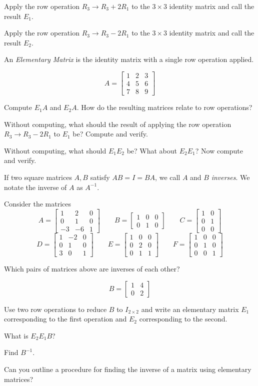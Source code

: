 \documentclass[letter]{article}
\newcommand{\mat}[1]{\begin{bmatrix}#1\end{bmatrix}}
\begin{document}
	\begin{Enum}
		\item Apply the row operation $R_3\to R_3+2R_1$ to the $3\times 3$ identity
		matrix and call the result $E_1$.
		\item Apply the row operation $R_3\to R_3-2R_1$ to the $3\times 3$ identity
		matrix and call the result $E_2$.
	\end{Enum}
	An \emph{Elementary Matrix} is the identity matrix with a single row operation applied.

	\[
		A=\mat{1&2&3\\4&5&6\\7&8&9}
	\]
	\begin{Enum}[resume]
		\item Compute $E_1A$ and $E_2A$.  How do the resulting matrices relate to row
		operations?
		\item Without computing, what should the result of applying the row
		operation $R_3\to R_3-2R_1$ to $E_1$ be?  Compute and verify.
		\item Without computing, what should $E_1E_2$ be?  What about $E_2E_1$?
		Now compute and verify.
	\end{Enum}

	If two square matrices $A,B$ satisfy $AB=I=BA$, we call $A$ and $B$ \emph{inverses}.
	We notate the inverse of $A$ as $A^{-1}$.

	Consider the matrices 
	\[
		A=\mat{1&2&0\\0&1&0\\-3&-6&1}\qquad
		B=\mat{1&0&0\\0&1&0}\qquad
		C=\mat{1&0\\0&1\\0&0}
	\]
	\[
		D=\mat{1&-2&0\\0&1&0\\3&0&1}\qquad
		E=\mat{1&0&0\\0&2&0\\0&1&1}\qquad
		F=\mat{1&0&0\\0&1&0\\0&0&1}
	\]
	\begin{Enum}
		\item Which pairs of matrices above are inverses of each other?
	\end{Enum}

	\[
		B=\mat{1 &4\\0 &2}
	\]
	\begin{Enum}
		\item Use two row operations to reduce $B$ to $I_{2\times 2}$
		and write an elementary matrix $E_1$ corresponding to the first operation
		and $E_2$ corresponding to the second.
		\item What is $E_2E_1B$?
		\item Find $B^{-1}$.
		\item Can you outline a procedure for finding the inverse of a matrix
		using elementary matrices?
	\end{Enum}
\end{document}
